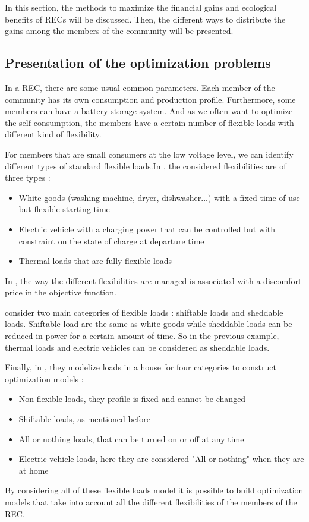 \documentclass[12pt,a4paper]{article}
\begin{document}
In this section, the methods to maximize the financial gains and ecological benefits of RECs will be discussed. Then, the different ways to distribute the gains among the members of the community will be presented.
\subsection{Presentation of the optimization problems}
\label{section_optimization}

In a REC, there are some usual common parameters. Each member of the community has its own consumption and production profile. Furthermore, some members can have a battery storage system. And as we often want to optimize the self-consumption, the members have a certain number of flexible loads with different kind of flexibility. 

For members that are small consumers at the low voltage level, we can identify different types of standard flexible loads.In \cite{article_6}, the considered flexibilities are of three types : 
\begin{itemize}
    \item{White goods (washing machine, dryer, dishwasher...) with a fixed time of use but flexible starting time}
    \item {Electric vehicle with a charging power that can be controlled but with constraint on the state of charge at departure time}
    \item {Thermal loads that are fully flexible loads}
\end{itemize}
In \cite{article_6}, the way the different flexibilities are managed is associated with a discomfort price in the objective function.

\cite{article_9} consider two main categories of flexible loads : shiftable loads and sheddable loads. Shiftable load are the same as white goods while sheddable loads can be reduced in power for a certain amount of time. So in the previous example, thermal loads and electric vehicles can be considered as sheddable loads.

Finally, in \cite{these_sorel}, they modelize loads in a house for four categories to construct optimization models : 
\begin{itemize}
    \item {Non-flexible loads, they profile is fixed and cannot be changed}
    \item {Shiftable loads, as mentioned before}
    \item {All or nothing loads, that can be turned on or off at any time}
    \item {Electric vehicle loads, here they are considered "All or nothing" when they are at home}
\end{itemize}
By considering all of these flexible loads model it is possible to build optimization models that take into account all the different flexibilities of the members of the REC.
\end{document}
